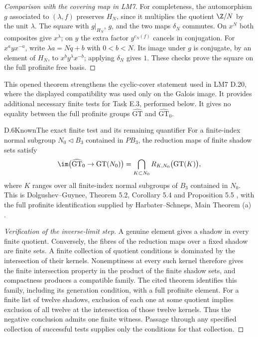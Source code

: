 \begin{proof}[Comparison with the covering map in LM7]
For completeness, the automorphism $g$ associated to $(\lambda,f)$
preserves $H_N$, since it multiplies the quotient $\Z/N$ by the unit
$\lambda$. The square with $g|_{H_N}$, $g$, and the two maps
$\delta_N$ commutes. On $x^N$ both composites give $x^\lambda$;
on $y$ the extra factor $y^{c_N(f)}$ cancels in conjugation.
For $x^ayx^{-a}$, write $\lambda a=Nq+b$ with
$0<b<N$. Its image under $g$ is conjugate, by an element of $H_N$,
to $x^by^\lambda x^{-b}$; applying $\delta_N$ gives $1$.
These checks prove the square on the full profinite free basis.
\end{proof}

This opened theorem strengthens the cyclic-cover statement used in
LM7 D.20, where the displayed compatibility was used only on the
Galois image. It provides additional necessary finite tests for Task
E.3, performed below. It gives no equality between the full profinite
groups $\widehat{\mathrm{GT}}$ and $\widehat{\mathrm{GT}}_0$.

\begin{statement}{D.6}{Known}{The exact finite test and its remaining quantifier}
For a finite-index normal subgroup $N_0\triangleleft B_3$ contained in
$PB_3$, the reduction maps of finite shadow sets satisfy
\[
 \im\bigl(\widehat{\mathrm{GT}}_0\to\mathrm{GT}(N_0)\bigr)
 =\bigcap_{K\subset N_0}
 R_{K,N_0}\bigl(\mathrm{GT}(K)\bigr),
\]
where $K$ ranges over all finite-index normal subgroups of $B_3$
contained in $N_0$. This is Dolgushev--Guynee, Theorem 5.2,
Corollary 5.4 and Proposition 5.5 \cite{DE_DolgushevGuynee2024},
with the full profinite identification supplied by Harbater--Schneps,
Main Theorem (a) \cite{DE_HarbaterSchneps2000}.
\end{statement}
\begin{proof}[Verification of the inverse-limit step]
A genuine element gives a shadow in every finite quotient. Conversely,
the fibres of the reduction maps over a fixed shadow are finite sets.
A finite collection of quotient conditions is dominated by the
intersection of their kernels. Nonemptiness at every such kernel
therefore gives the finite intersection property in the product of the
finite shadow sets, and compactness produces a compatible family.
The cited theorem identifies this family, including its generation
condition, with a full profinite element. For a finite list of twelve
shadows, exclusion of each one at some quotient implies exclusion of
all twelve at the intersection of those twelve kernels. Thus the
negative conclusion admits one finite witness. Passage through any
specified collection of successful tests supplies only the conditions
for that collection.
\end{proof}

